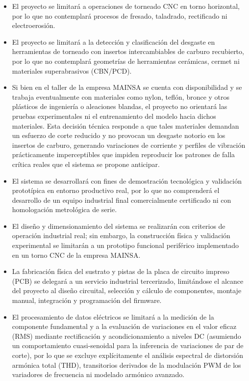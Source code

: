 \begin{itemize}
\item El proyecto se limitará a operaciones de torneado CNC en torno horizontal, por lo que no contemplará procesos de fresado, taladrado, rectificado ni electroerosión.
\item El proyecto se limitará a la detección y clasificación del desgaste en herramientas de torneado con insertos intercambiables de carburo recubierto, por lo que no contemplará geometrías de herramientas cerámicas, cermet ni materiales superabrasivos (CBN/PCD).
\item Si bien en el taller de la empresa MAINSA se cuenta con disponibilidad y se trabaja eventualmente con materiales como nylon, teflón, bronce y otros plásticos de ingeniería o aleaciones blandas, el proyecto no orientará las pruebas experimentales ni el entrenamiento del modelo hacia dichos materiales. Esta decisión técnica responde a que tales materiales demandan un esfuerzo de corte reducido y no provocan un desgaste notorio en los insertos de carburo, generando variaciones de corriente y perfiles de vibración prácticamente imperceptibles que impiden reproducir los patrones de falla crítica reales que el sistema se propone anticipar.
\item El sistema se desarrollará con fines de demostración tecnológica y validación prototípica en entorno productivo real, por lo que no comprenderá el desarrollo de un equipo industrial final comercialmente certificado ni con homologación metrológica de serie.
\item El diseño y dimensionamiento del sistema se realizarán con criterios de operación industrial real; sin embargo, la construcción física y validación experimental se limitarán a un prototipo funcional periférico implementado en un torno CNC de la empresa MAINSA.
\item La fabricación física del sustrato y pistas de la placa de circuito impreso (PCB) se delegará a un servicio industrial tercerizado, limitándose el alcance del proyecto al diseño circuital, selección y cálculo de componentes, montaje manual, integración y programación del firmware.
\item El procesamiento de datos eléctricos se limitará a la medición de la componente fundamental y a la evaluación de variaciones en el valor eficaz (RMS) mediante rectificación y acondicionamiento a niveles DC (asumiendo un comportamiento cuasi-senoidal para la inferencia de variaciones de par de corte), por lo que se excluye explícitamente el análisis espectral de distorsión armónica total (THD), transitorios derivados de la modulación PWM de los variadores de frecuencia ni modelado armónico avanzado.

\end{itemize}
